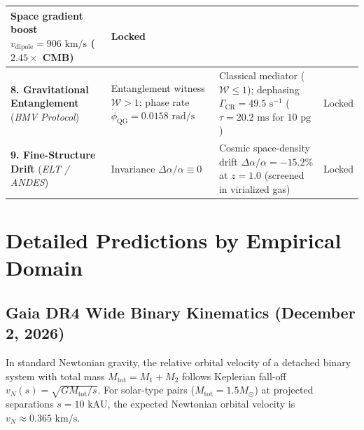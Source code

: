 \documentclass[aps,prd,reprint,superscriptaddress,nofootinbib,twocolumn,floatfix]{revtex4-2}
\begin{document}
\begin{table}[t]
\begin{ruledtabular}
\begin{tabular}{lllc}
\parbox[t]{5.8cm}{Space gradient boost $v_{\text{dipole}} = 906\text{ km/s}$ ($2.45\times$ CMB)} &
Locked \\
\hline
\parbox[t]{4.3cm}{\textbf{8. Gravitational Entanglement} (\textit{BMV Protocol})} &
\parbox[t]{4.9cm}{Entanglement witness $\mathcal{W} > 1$; phase rate $\dot{\phi}_{\text{QG}} = 0.0158\text{ rad/s}$} &
\parbox[t]{5.8cm}{Classical mediator ($\mathcal{W} \le 1$); dephasing $\Gamma_{\text{CR}} = 49.5\text{ s}^{-1}$ ($\tau = 20.2\text{ ms}$ for $10\text{ pg}$)} &
Locked \\
\hline
\parbox[t]{4.3cm}{\textbf{9. Fine-Structure Drift} (\textit{ELT / ANDES})} &
\parbox[t]{4.9cm}{Invariance $\Delta\alpha/\alpha \equiv 0$} &
\parbox[t]{5.8cm}{Cosmic space-density drift $\Delta\alpha/\alpha = -15.2\%$ at $z=1.0$ (screened in virialized gas)} &
Locked \\
\end{tabular}
\end{ruledtabular}
\end{table}

\section{Detailed Predictions by Empirical Domain}
\label{sec:domains}

\subsection{Gaia DR4 Wide Binary Kinematics (December 2, 2026)}
\label{sec:wide_binaries}

In standard Newtonian gravity, the relative orbital velocity of a detached binary system with total mass $M_{\text{tot}} = M_1 + M_2$ follows Keplerian fall-off $v_N(s) = \sqrt{G M_{\text{tot}} / s}$. For solar-type pairs ($M_{\text{tot}} = 1.5 M_\odot$) at projected separations $s = 10\text{ kAU}$, the expected Newtonian orbital velocity is $v_N \approx 0.365\text{ km/s}$.
\end{document}
